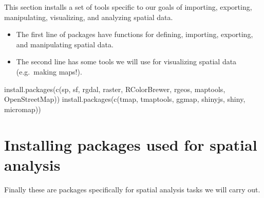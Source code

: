 \documentclass[
]{book}
\newenvironment{Shaded}{\begin{snugshade}}{\end{snugshade}}
\newcommand{\FunctionTok}[1]{\textcolor[rgb]{0.00,0.00,0.00}{#1}}
\newcommand{\NormalTok}[1]{#1}
\newcommand{\StringTok}[1]{\textcolor[rgb]{0.31,0.60,0.02}{#1}}
\providecommand{\tightlist}{%
  \setlength{\itemsep}{0pt}\setlength{\parskip}{0pt}}
\begin{document}
This section installs a set of tools specific to our goals of importing, exporting, manipulating, visualizing, and analyzing spatial data.

\begin{itemize}
\tightlist
\item
  The first line of packages have functions for defining, importing, exporting, and manipulating spatial data.
\item
  The second line has some tools we will use for visualizing spatial data (e.g.~making maps!).
\end{itemize}

\begin{Shaded}
\begin{Highlighting}[]
\FunctionTok{install.packages}\NormalTok{(}\FunctionTok{c}\NormalTok{(}\StringTok{\textquotesingle{}sp\textquotesingle{}}\NormalTok{, }\StringTok{\textquotesingle{}sf\textquotesingle{}}\NormalTok{, }\StringTok{\textquotesingle{}rgdal\textquotesingle{}}\NormalTok{, }\StringTok{\textquotesingle{}raster\textquotesingle{}}\NormalTok{, }\StringTok{\textquotesingle{}RColorBrewer\textquotesingle{}}\NormalTok{, }\StringTok{\textquotesingle{}rgeos\textquotesingle{}}\NormalTok{, }\StringTok{\textquotesingle{}maptools\textquotesingle{}}\NormalTok{, }\StringTok{\textquotesingle{}OpenStreetMap\textquotesingle{}}\NormalTok{))  }
\FunctionTok{install.packages}\NormalTok{(}\FunctionTok{c}\NormalTok{(}\StringTok{\textquotesingle{}tmap\textquotesingle{}}\NormalTok{, }\StringTok{\textquotesingle{}tmaptools\textquotesingle{}}\NormalTok{, }\StringTok{\textquotesingle{}ggmap\textquotesingle{}}\NormalTok{, }\StringTok{\textquotesingle{}shinyjs\textquotesingle{}}\NormalTok{, }\StringTok{\textquotesingle{}shiny\textquotesingle{}}\NormalTok{, }\StringTok{\textquotesingle{}micromap\textquotesingle{}}\NormalTok{)) }
\end{Highlighting}
\end{Shaded}

\hypertarget{installing-packages-used-for-spatial-analysis}{%
\section*{Installing packages used for spatial analysis}\label{installing-packages-used-for-spatial-analysis}}

Finally these are packages specifically for spatial analysis tasks we will carry out.
\end{document}
